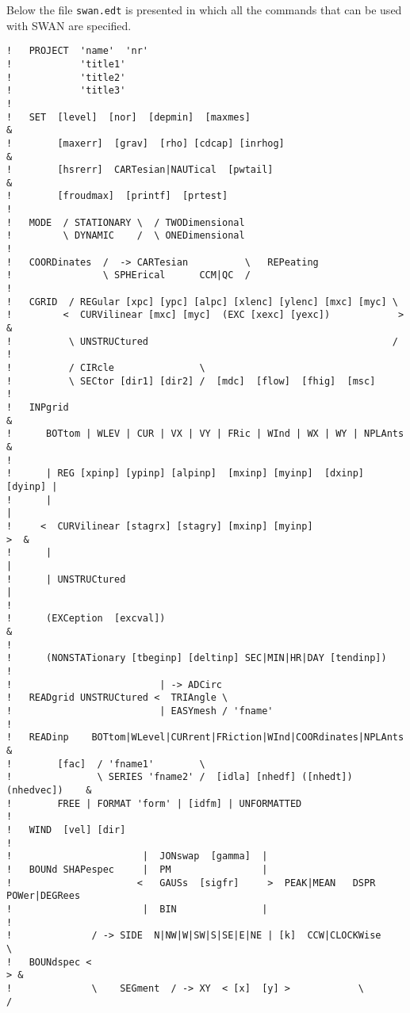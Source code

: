 \documentclass[12pt]{book}
\begin{document}
Below the file {\tt swan.edt} is presented in which all the commands that can be used with SWAN are specified.
\\[2ex]
\begin{verbatim}
!   PROJECT  'name'  'nr'
!            'title1'
!            'title2'
!            'title3'
!
!   SET  [level]  [nor]  [depmin]  [maxmes]                                 &
!        [maxerr]  [grav]  [rho] [cdcap] [inrhog]                           &
!        [hsrerr]  CARTesian|NAUTical  [pwtail]                             &
!        [froudmax]  [printf]  [prtest]
!
!   MODE  / STATIONARY \  / TWODimensional
!         \ DYNAMIC    /  \ ONEDimensional
!
!   COORDinates  /  -> CARTesian          \   REPeating
!                \ SPHErical      CCM|QC  /
!
!   CGRID  / REGular [xpc] [ypc] [alpc] [xlenc] [ylenc] [mxc] [myc] \
!         <  CURVilinear [mxc] [myc]  (EXC [xexc] [yexc])            >      &
!          \ UNSTRUCtured                                           /
!
!          / CIRcle               \
!          \ SECtor [dir1] [dir2] /  [mdc]  [flow]  [fhig]  [msc]
!
!   INPgrid                                                                 &
!      BOTtom | WLEV | CUR | VX | VY | FRic | WInd | WX | WY | NPLAnts      &
!
!      | REG [xpinp] [ypinp] [alpinp]  [mxinp] [myinp]  [dxinp] [dyinp] |
!      |                                                                |
!     <  CURVilinear [stagrx] [stagry] [mxinp] [myinp]                   >  &
!      |                                                                |
!      | UNSTRUCtured                                                   |
!
!      (EXCeption  [excval])                                                &
!
!      (NONSTATionary [tbeginp] [deltinp] SEC|MIN|HR|DAY [tendinp])
!
!                          | -> ADCirc
!   READgrid UNSTRUCtured <  TRIAngle \
!                          | EASYmesh / 'fname'
!
!   READinp    BOTtom|WLevel|CURrent|FRiction|WInd|COORdinates|NPLAnts      &
!        [fac]  / 'fname1'        \
!               \ SERIES 'fname2' /  [idla] [nhedf] ([nhedt]) (nhedvec])    &
!        FREE | FORMAT 'form' | [idfm] | UNFORMATTED
!
!   WIND  [vel] [dir]
!
!                       |  JONswap  [gamma]  |
!   BOUNd SHAPespec     |  PM                |
!                      <   GAUSs  [sigfr]     >  PEAK|MEAN   DSPR  POWer|DEGRees
!                       |  BIN               |
!
!              / -> SIDE  N|NW|W|SW|S|SE|E|NE | [k]  CCW|CLOCKWise       \
!   BOUNdspec <                                                           > &
!              \    SEGment  / -> XY  < [x]  [y] >            \          /

\end{verbatim}
\end{document}
